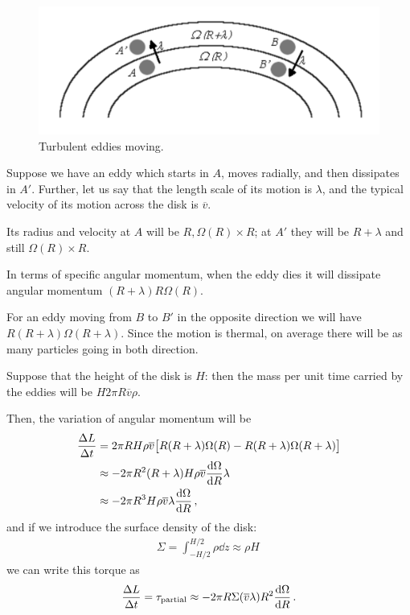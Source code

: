 \documentclass[main.tex]{subfiles}
\begin{document}
\begin{figure}[ht]
\centering
\includegraphics[width=\textwidth]{figures/turbulent-eddies-accretion}
\caption{Turbulent eddies moving.}
\label{fig:turbulent-eddies-accretion}
\end{figure}

Suppose we have an eddy which starts in \(A\), moves radially, and then dissipates in \(A'\).
Further, let us say that the length scale of its motion is \(\lambda \), and the typical velocity of its motion across the disk is \(\overline{v}\). 

Its radius and velocity at \(A\) will be \(R, \Omega(R) \times  R\); at \(A'\) they will be \(R + \lambda \) and still \(\Omega (R) \times R\). 

In terms of specific angular momentum, when the eddy dies it will dissipate angular momentum \((R+\lambda) R \Omega (R) \).

For an eddy moving from \(B\) to \(B'\) in the opposite direction we will have \(R (R + \lambda ) \Omega (R + \lambda )\). 
Since the motion is thermal, on average there will be as many particles going in both direction.


Suppose that the height of the disk is \(H\): then the mass per unit time carried by the eddies will be \(H 2 \pi R \overline{v} \rho \). 

Then, the variation of angular momentum will be 
%
\begin{align}
\frac{\Delta L}{\Delta t} &= 2 \pi R H \rho \overline{v} 
\qty[R (R + \lambda ) \Omega (R) - R (R+\lambda ) \Omega (R + \lambda )]  \\
&\approx - 2 \pi R^2 (R+ \lambda ) H \rho \overline{v} \dv{\Omega }{R} \lambda  \\
&\approx - 2\pi R^3 H \rho \overline{v} \lambda \dv{\Omega }{R}
\,,
\end{align}
%
and if we introduce the surface density of the disk: 
%
\begin{align}
\Sigma = \int_{- H/2 }^{H/2} \rho \dd{z} \approx \rho H
\,
\end{align}
%
we can write this torque as
%
\begin{align}
\frac{ \Delta L}{\Delta t} = \tau_{\text{partial}} \approx -2 \pi R \Sigma \qty(\overline{v} \lambda ) R^2 \dv{\Omega }{R}
\,.
\end{align}
\end{document}
